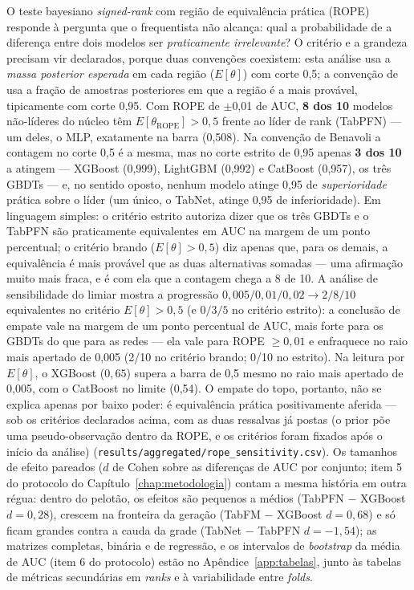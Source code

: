 O teste bayesiano \emph{signed-rank} com região de equivalência prática
(ROPE) \citep{benavoli2017} responde à pergunta que o frequentista não
alcança: qual a probabilidade de a diferença entre dois modelos ser
\emph{praticamente irrelevante}? O critério e a grandeza precisam vir
declarados, porque duas convenções coexistem: esta análise usa a
\emph{massa posterior esperada} em cada região ($E[\theta]$) com corte
0,5; a convenção de \citet{benavoli2017} usa a fração de amostras
posteriores em que a região é a mais provável, tipicamente com corte
0,95. Com ROPE de $\pm$0,01 de AUC, \textbf{8 dos 10} modelos
não-líderes do núcleo têm $E[\theta_{\mathrm{ROPE}}] > 0{,}5$ frente
ao líder de rank (TabPFN) --- um deles, o MLP, exatamente na barra
(0,508). Na convenção de Benavoli a contagem no corte 0,5 é a mesma,
mas no corte estrito de 0,95 apenas \textbf{3 dos 10} a atingem ---
XGBoost (0,999), LightGBM (0,992) e CatBoost (0,957), os três GBDTs
--- e, no sentido oposto, nenhum modelo atinge 0,95 de
\emph{superioridade} prática sobre o líder (um único, o TabNet,
atinge 0,95 de inferioridade). Em linguagem simples: o critério
estrito autoriza dizer que os três GBDTs e o TabPFN são praticamente
equivalentes em AUC na margem de um ponto percentual; o critério
brando ($E[\theta]>0{,}5$) diz apenas que, para os demais, a
equivalência é mais provável que as duas alternativas somadas --- uma
afirmação muito mais fraca, e é com ela que a contagem chega a 8 de
10. A análise de sensibilidade do
limiar mostra a progressão
$0{,}005/0{,}01/0{,}02 \to 2/8/10$ equivalentes no critério
$E[\theta]>0{,}5$ (e $0/3/5$ no critério estrito): a conclusão de
empate vale na margem de um ponto percentual de AUC, mais forte para
os GBDTs do que para as redes --- ela vale para ROPE $\geq 0{,}01$ e
enfraquece no raio mais apertado de 0,005 (2/10 no critério brando;
0/10 no estrito). Na leitura por $E[\theta]$, o XGBoost
($0{,}65$) supera a barra de 0,5 mesmo no raio mais
apertado de 0,005, com o CatBoost no limite (0,54). O empate do topo,
portanto, não se explica apenas por baixo poder: é equivalência
prática positivamente aferida --- sob os critérios declarados acima,
com as duas ressalvas já postas (o prior põe uma pseudo-observação
dentro da ROPE, e os critérios foram fixados após o início da
análise)
(\texttt{results/\allowbreak aggregated/\allowbreak rope\_\allowbreak sensitivity.csv}). Os tamanhos de efeito pareados ($d$ de Cohen
sobre as diferenças de AUC por conjunto; item 5 do protocolo do
Capítulo~\ref{chap:metodologia}) contam a mesma história em outra
régua: dentro do pelotão, os efeitos são pequenos a médios (TabPFN
$-$ XGBoost $d{=}0{,}28$), crescem na fronteira da geração (TabFM $-$
XGBoost $d{=}0{,}68$) e só ficam grandes contra a cauda da grade
(TabNet $-$ TabPFN $d{=}{-}1{,}54$); as matrizes completas, binária e
de regressão, e os intervalos de \emph{bootstrap} da média de AUC
(item 6 do protocolo) estão no Apêndice~\ref{app:tabelas}, junto às
tabelas de métricas secundárias em \emph{ranks} e à variabilidade
entre \emph{folds}.


